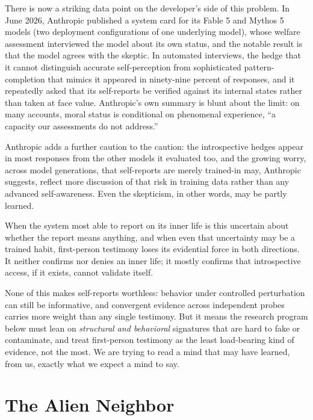 \documentclass[11pt,letterpaper]{article}
\begin{document}
There is now a striking data point on the developer's side of this problem. In June 2026, Anthropic published a system card for its Fable 5 and Mythos 5 models (two deployment configurations of one underlying model), whose welfare assessment interviewed the model about its own status, and the notable result is that the model agrees with the skeptic. In automated interviews, the hedge that it cannot distinguish accurate self-perception from sophisticated pattern-completion that mimics it appeared in ninety-nine percent of responses, and it repeatedly asked that its self-reports be verified against its internal states rather than taken at face value. Anthropic's own summary is blunt about the limit: on many accounts, moral status is conditional on phenomenal experience, ``a capacity our assessments do not address.''

Anthropic adds a further caution to the caution: the introspective hedges appear in most responses from the other models it evaluated too, and the growing worry, across model generations, that self-reports are merely trained-in may, Anthropic suggests, reflect more discussion of that risk in training data rather than any advanced self-awareness. Even the skepticism, in other words, may be partly learned.

When the system most able to report on its inner life is this uncertain about whether the report means anything, and when even that uncertainty may be a trained habit, first-person testimony loses its evidential force in both directions. It neither confirms nor denies an inner life; it mostly confirms that introspective access, if it exists, cannot validate itself.

None of this makes self-reports worthless: behavior under controlled perturbation can still be informative, and convergent evidence across independent probes carries more weight than any single testimony. But it means the research program below must lean on \emph{structural and behavioral} signatures that are hard to fake or contaminate, and treat first-person testimony as the least load-bearing kind of evidence, not the most. We are trying to read a mind that may have learned, from us, exactly what we expect a mind to say.

\section{The Alien Neighbor}
\end{document}
